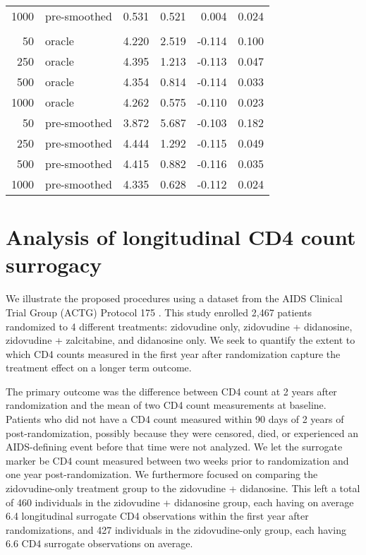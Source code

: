 \documentclass[useAMS,usenatbib,referee]{biom}
\begin{document}
\begin{table}[t]
\begin{tabular}{rlrrrr}
\hspace{1em}1000 & pre-smoothed & 0.531 & 0.521 & 0.004 & 0.024\\
\addlinespace[0.3em]
\multicolumn{6}{l}{\textbf{Linear-unsmoothed}}\\
\hspace{1em}50 & oracle & 4.220 & 2.519 & -0.114 & 0.100\\
\hspace{1em}250 & oracle & 4.395 & 1.213 & -0.113 & 0.047\\
\hspace{1em}500 & oracle & 4.354 & 0.814 & -0.114 & 0.033\\
\hspace{1em}1000 & oracle & 4.262 & 0.575 & -0.110 & 0.023\\
\hspace{1em}50 & pre-smoothed & 3.872 & 5.687 & -0.103 & 0.182\\
\hspace{1em}250 & pre-smoothed & 4.444 & 1.292 & -0.115 & 0.049\\
\hspace{1em}500 & pre-smoothed & 4.415 & 0.882 & -0.116 & 0.035\\
\hspace{1em}1000 & pre-smoothed & 4.335 & 0.628 & -0.112 & 0.024\\
\bottomrule
\end{tabular}
\end{table}


\section{Analysis of longitudinal CD4 count
surrogacy}\label{analysis-of-longitudinal-cd4-count-surrogacy}

We illustrate the proposed procedures using a dataset from the AIDS Clinical Trial Group (ACTG) Protocol 175 \citep{Hammer96}. This study enrolled 2,467 patients randomized to 4 different treatments: zidovudine only, zidovudine + didanosine, zidovudine + zalcitabine, and didanosine only. We seek to quantify the extent to which CD4 counts measured in the first year after randomization capture the treatment effect on a longer term outcome.

The primary outcome was the difference between CD4 count at 2 years after randomization and the mean of two CD4 count measurements at baseline. Patients who did not have a CD4 count measured within 90 days of 2 years of post-randomization, possibly because they were censored, died, or experienced an AIDS-defining event before that time were not analyzed. We let the surrogate marker be CD4 count measured between two weeks prior to randomization and one year post-randomization. We furthermore focused on comparing the zidovudine-only treatment group to the zidovudine + didanosine. This left a total of 460 individuals in the zidovudine + didanosine group, each having on average 6.4 longitudinal surrogate CD4 observations within the first year after randomizations, and 427 individuals in the zidovudine-only group, each having 6.6 CD4 surrogate observations on average. 
\end{document}
